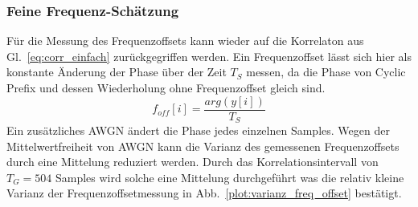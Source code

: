 \subsubsection{Feine Frequenz-Schätzung}
Für die Messung des Frequenzoffsets kann wieder auf die Korrelaton aus Gl.~\ref{eq:corr_einfach} zurückgegriffen werden. Ein Frequenzoffset lässt sich hier als konstante Änderung der Phase über der Zeit $T_S$ messen, da die Phase von Cyclic Prefix und dessen Wiederholung ohne Frequenzoffset gleich sind. 
\begin{equation}
f_{off}[i] = \frac{arg(y[i])}{T_S}
\label{eq:fine_frequency_estimation}
\end{equation}
Ein zusätzliches \ac{AWGN} ändert die Phase jedes einzelnen Samples. Wegen der Mittelwertfreiheit von \ac{AWGN} kann die Varianz des gemessenen Frequenzoffsets durch eine Mittelung reduziert werden.
Durch das Korrelationsintervall von $T_G = 504$ Samples wird solche eine Mittelung durchgeführt was die relativ kleine Varianz der Frequenzoffsetmessung in Abb.~\ref{plot:varianz_freq_offset} bestätigt.
\begin{center}
\end{center}

